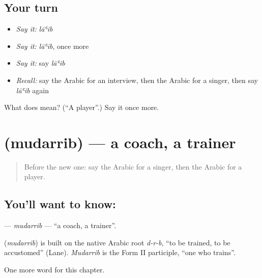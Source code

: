 \subsection*{Your turn}
\begin{itemize}
\raggedright
  \item \emph{Say it:} \emph{lāʿib}
  \item \emph{Say it:} \emph{lāʿib}, once more
  \item \emph{Say it:} say \emph{lāʿib}
  \item \emph{Recall:} say the Arabic for an interview, then the Arabic for a singer, then say \emph{lāʿib} again
\end{itemize}

\begin{tcolorbox}[breakable,colback=teal!4,colframe=teal!35!black,title={Before you move on}]
What does  mean? (\textquotedblleft{}A player\textquotedblright{}.) Say it once more.
\end{tcolorbox}
\section[\texorpdfstring{\ar{مدرب} (mudarrib)}{مدرب (mudarrib)}]{ (mudarrib) — a coach, a trainer}

\label{lesson:AR-C190-mudarrib}



\begin{quote}
Before the new one: say the Arabic for a singer, then the Arabic for a player.
\end{quote}

\subsection*{You'll want to know: }
\textbf{} — \emph{mudarrib} — \textquotedblleft{}a coach, a trainer\textquotedblright{}.

\begin{cousinweb}
\textbf{} (\emph{mudarrib}) is built on the native Arabic root \emph{d-r-b}, \textquotedblleft{}to be trained, to be accustomed\textquotedblright{} (Lane). \emph{Mudarrib} is the Form II participle, \textquotedblleft{}one who trains\textquotedblright{}.
\end{cousinweb}

\begin{grammarlens}[title={What you've built}]
One more word for this chapter.
\end{grammarlens}

